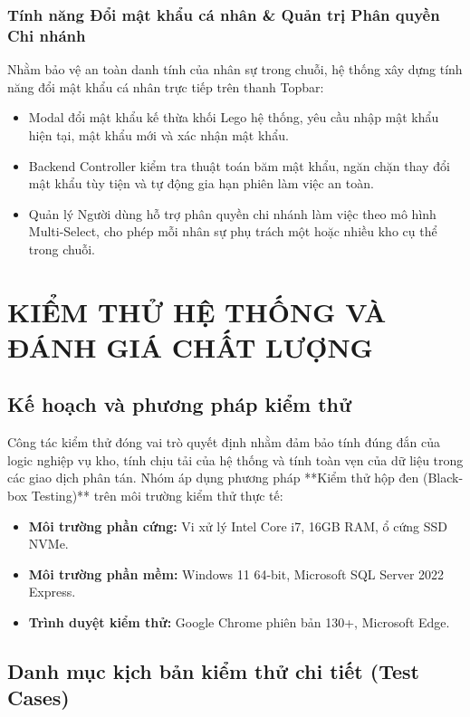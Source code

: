 \documentclass[12pt,a4paper]{report}
\renewcommand{\_}{\textunderscore\allowbreak}
\begin{document}
\subsection{Tính năng Đổi mật khẩu cá nhân \& Quản trị Phân quyền Chi nhánh}
Nhằm bảo vệ an toàn danh tính của nhân sự trong chuỗi, hệ thống xây dựng tính năng đổi mật khẩu cá nhân trực tiếp trên thanh Topbar:
\begin{itemize}
    \item Modal đổi mật khẩu kế thừa khối Lego hệ thống, yêu cầu nhập mật khẩu hiện tại, mật khẩu mới và xác nhận mật khẩu.
    \item Backend Controller kiểm tra thuật toán băm mật khẩu, ngăn chặn thay đổi mật khẩu tùy tiện và tự động gia hạn phiên làm việc an toàn.
    \item Quản lý Người dùng hỗ trợ phân quyền chi nhánh làm việc theo mô hình Multi-Select, cho phép mỗi nhân sự phụ trách một hoặc nhiều kho cụ thể trong chuỗi.
\end{itemize}

\cleardoublepage

\chapter{KIỂM THỬ HỆ THỐNG VÀ ĐÁNH GIÁ CHẤT LƯỢNG}

\section{Kế hoạch và phương pháp kiểm thử}
Công tác kiểm thử đóng vai trò quyết định nhằm đảm bảo tính đúng đắn của logic nghiệp vụ kho, tính chịu tải của hệ thống và tính toàn vẹn của dữ liệu trong các giao dịch phân tán. Nhóm áp dụng phương pháp **Kiểm thử hộp đen (Black-box Testing)** trên môi trường kiểm thử thực tế:
\begin{itemize}
    \item \textbf{Môi trường phần cứng:} Vi xử lý Intel Core i7, 16GB RAM, ổ cứng SSD NVMe.
    \item \textbf{Môi trường phần mềm:} Windows 11 64-bit, Microsoft SQL Server 2022 Express.
    \item \textbf{Trình duyệt kiểm thử:} Google Chrome phiên bản 130+, Microsoft Edge.
\end{itemize}

\section{Danh mục kịch bản kiểm thử chi tiết (Test Cases)}
\end{document}

